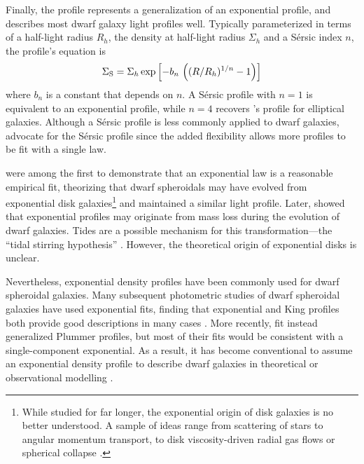 Finally, the \citet{sersic1963} profile represents a generalization of
an exponential profile, and describes most dwarf galaxy light profiles
well. Typically parameterized in terms of a half-light radius \(R_h\),
the density at half-light radius \(\Sigma_h\) and a Sérsic index \(n\),
the profile's equation is \begin{equation}{
\Sigma_{\rm S} = \Sigma_h \exp\left[-b_n \,  \left((R/R_h)^{1/n} - 1\right)\right]
}\end{equation} where \(b_n\) is a constant that depends on \(n\). A
Sérsic profile with \(n=1\) is equivalent to an exponential profile,
while \(n=4\) recovers \citet{devaucouleurs1948}'s profile for
elliptical galaxies. Although a Sérsic profile is less commonly applied
to dwarf galaxies, \citet{munoz+2018} advocate for the Sérsic profile
since the added flexibility allows more profiles to be fit with a single
law.

\citet{faber+lin1983} were among the first to demonstrate that an
exponential law is a reasonable empirical fit, theorizing that dwarf
spheroidals may have evolved from exponential disk galaxies\footnote{While
  studied for far longer, the exponential origin of disk galaxies is no
  better understood. A sample of ideas range from scattering of stars
  \citep{elmegreen+struck2013, wu+2022} to angular momentum transport,
  to disk viscosity-driven radial gas flows
  \citep{lin+pringle1987, wang+lilly2022} or spherical collapse
  \citep{freeman1970}.} and maintained a similar light profile. Later,
\citet{read+gilmore2005} showed that exponential profiles may originate
from mass loss during the evolution of dwarf galaxies. Tides are a
possible mechanism for this transformation---the ``tidal stirring
hypothesis'' \citep{mayer+2001a, klimentowski+2009}. However, the
theoretical origin of exponential disks is unclear.

Nevertheless, exponential density profiles have been commonly used for
dwarf spheroidal galaxies. Many subsequent photometric studies of dwarf
spheroidal galaxies have used exponential fits, finding that exponential
and King profiles both provide good descriptions in many cases
\citep{binggeli+sandage+tarenghi1984, mateo1998, mcconnachie+irwin2006, cicuendez+2018}.
More recently, \citet{moskowitz+walker2020} fit instead generalized
Plummer profiles, but most of their fits would be consistent with a
single-component exponential. As a result, it has become conventional to
assume an exponential density profile to describe dwarf galaxies in
theoretical or observational modelling
\citep[e.g.,][]{kowalczyk+2013, martin+2016, MV2020a, battaglia+2022}.

